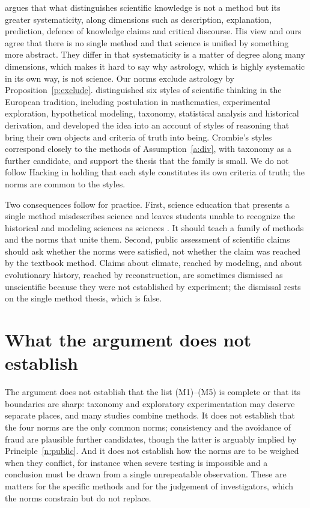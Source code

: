 \documentclass{situationist-preprint}
\begin{document}
\citet{HoyningenHuene2013} argues that what distinguishes scientific knowledge is not a method but its greater systematicity, along dimensions such as description, explanation, prediction, defence of knowledge claims and critical discourse. His view and ours agree that there is no single method and that science is unified by something more abstract. They differ in that systematicity is a matter of degree along many dimensions, which makes it hard to say why astrology, which is highly systematic in its own way, is not science. Our norms exclude astrology by Proposition~\ref{p:exclude}. \citet{Crombie1994} distinguished six styles of scientific thinking in the European tradition, including postulation in mathematics, experimental exploration, hypothetical modeling, taxonomy, statistical analysis and historical derivation, and \citet{Hacking1992} developed the idea into an account of styles of reasoning that bring their own objects and criteria of truth into being. Crombie's styles correspond closely to the methods of Assumption~\ref{a:div}, with taxonomy as a further candidate, and support the thesis that the family is small. We do not follow Hacking in holding that each style constitutes its own criteria of truth; the norms are common to the styles.

Two consequences follow for practice. First, science education that presents a single method misdescribes science and leaves students unable to recognize the historical and modeling sciences as sciences \citep{Bauer1992}. It should teach a family of methods and the norms that unite them. Second, public assessment of scientific claims should ask whether the norms were satisfied, not whether the claim was reached by the textbook method. Claims about climate, reached by modeling, and about evolutionary history, reached by reconstruction, are sometimes dismissed as unscientific because they were not established by experiment; the dismissal rests on the single method thesis, which is false.

\section{What the argument does not establish}

\begin{remark}\label{r:limits}
The argument does not establish that the list (M1)--(M5) is complete or that its boundaries are sharp: taxonomy and exploratory experimentation may deserve separate places, and many studies combine methods. It does not establish that the four norms are the only common norms; consistency and the avoidance of fraud are plausible further candidates, though the latter is arguably implied by Principle~\ref{n:public}. And it does not establish how the norms are to be weighed when they conflict, for instance when severe testing is impossible and a conclusion must be drawn from a single unrepeatable observation. These are matters for the specific methods and for the judgement of investigators, which the norms constrain but do not replace.
\end{remark}
\end{document}
